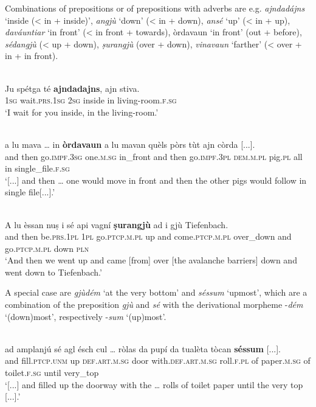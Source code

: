 Combinations of prepositions or of prepositions with adverbs are e.g. \textit{ajndadájns} `inside (< in + inside)', \textit{angjù} `down' (< in + down), \textit{ansé} `up' (< in + up), \textit{daváuntiar} `in front' (< in front + towards), òrdavaun `in front' (out + before), \textit{sédangjù} (< up + down), \textit{ṣurangjù} (over + down), \textit{vinavaun} `farther' (< over + in + in front).

\ea
\label{}
\\
\gll Ju spétga té \textbf{ajndadajns}, ajn stiva.\\
\textsc{1sg} wait\textsc{.prs.1sg} \textsc{2sg} inside in living-room.\textsc{f.sg}\\
\glt `I wait for you inside, in the living-room.'
\z

\ea
\label{}
\\
	\gll    [...] a lu mava … in \textbf{òrdavaun} a lu mavan quèls pòrs tùt ajn còrda [...].\\
{} and then go.\textsc{impf.3sg} {} one.\textsc{m.sg} in\_front and then go.\textsc{impf.3pl} \textsc{dem.m.pl} pig.\textsc{pl} all in single\_file.\textsc{f.sg} \\
\glt `[...] and then … one would move in front and then the other pigs would follow in single file[...].'
\z

\ea
\label{}
\\
\gll A lu èssan nuṣ i sé api vagní \textbf{ṣurangjù} ad i gjù Tiefenbach.\\
and then be.\textsc{prs.1pl} \textsc{1pl} go.\textsc{ptcp.m.pl} up and come.\textsc{ptcp.m.pl} over\_down and go.\textsc{ptcp.m.pl} down \textsc{pln} \\
\glt `And then we went up and came [from] over [the avalanche barriers] down and went down to Tiefenbach.'
\z




A special case are \textit{gjùdém} `at the very bottom' and \textit{séssum} `upmost', which are a combination of the preposition \textit{gjù} and \textit{sé} with the derivational morpheme -\textit{dém} `(down)most', respectively -\textit{sum} `(up)most'.


\ea
\label{}
\\
\gll [...] ad amplanjú sé agl ésch cul … ròlas da pupí da tualèta tòcan \textbf{séssum} [...].\\
{} and fill.\textsc{ptcp.unm} up \textsc{def.art.m.sg} door with.\textsc{def.art.m.sg} {} roll.\textsc{f.pl} of paper.\textsc{m.sg} of toilet.\textsc{f.sg} until very\_top\\
\glt `[...] and filled up the doorway with the … rolls of toilet paper until the very top [...].'
\z

